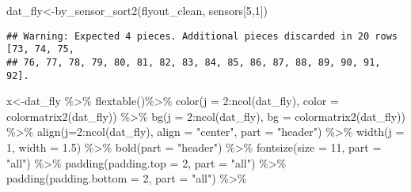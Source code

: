 \documentclass[
]{article}
\newenvironment{Shaded}{\begin{snugshade}}{\end{snugshade}}
\newcommand{\AttributeTok}[1]{\textcolor[rgb]{0.77,0.63,0.00}{#1}}
\newcommand{\DecValTok}[1]{\textcolor[rgb]{0.00,0.00,0.81}{#1}}
\newcommand{\FloatTok}[1]{\textcolor[rgb]{0.00,0.00,0.81}{#1}}
\newcommand{\FunctionTok}[1]{\textcolor[rgb]{0.00,0.00,0.00}{#1}}
\newcommand{\NormalTok}[1]{#1}
\newcommand{\OtherTok}[1]{\textcolor[rgb]{0.56,0.35,0.01}{#1}}
\newcommand{\SpecialCharTok}[1]{\textcolor[rgb]{0.00,0.00,0.00}{#1}}
\newcommand{\StringTok}[1]{\textcolor[rgb]{0.31,0.60,0.02}{#1}}
\begin{document}
\begin{longtable}[c]{|p{2.12in}|p{1.20in}|p{1.20in}|p{1.20in}|p{1.20in}|p{1.20in}|p{1.20in}|p{1.20in}|p{1.20in}|p{1.20in}|p{1.20in}|p{1.20in}}
\end{longtable}

\begin{Shaded}
\begin{Highlighting}[]
\NormalTok{dat\_fly}\OtherTok{\textless{}{-}}\FunctionTok{by\_sensor\_sort2}\NormalTok{(flyout\_clean, sensors[}\DecValTok{5}\NormalTok{,}\DecValTok{1}\NormalTok{])}
\end{Highlighting}
\end{Shaded}

\begin{verbatim}
## Warning: Expected 4 pieces. Additional pieces discarded in 20 rows [73, 74, 75,
## 76, 77, 78, 79, 80, 81, 82, 83, 84, 85, 86, 87, 88, 89, 90, 91, 92].
\end{verbatim}

\begin{Shaded}
\begin{Highlighting}[]
\NormalTok{x}\OtherTok{\textless{}{-}}\NormalTok{dat\_fly }\SpecialCharTok{\%\textgreater{}\%}
    \FunctionTok{flextable}\NormalTok{()}\SpecialCharTok{\%\textgreater{}\%}
    \FunctionTok{color}\NormalTok{(}\AttributeTok{j =} \DecValTok{2}\SpecialCharTok{:}\FunctionTok{ncol}\NormalTok{(dat\_fly), }\AttributeTok{color =} \FunctionTok{colormatrix2}\NormalTok{(dat\_fly)) }\SpecialCharTok{\%\textgreater{}\%}
    \FunctionTok{bg}\NormalTok{(}\AttributeTok{j =} \DecValTok{2}\SpecialCharTok{:}\FunctionTok{ncol}\NormalTok{(dat\_fly), }\AttributeTok{bg =} \FunctionTok{colormatrix2}\NormalTok{(dat\_fly)) }\SpecialCharTok{\%\textgreater{}\%}
    \FunctionTok{align}\NormalTok{(}\AttributeTok{j=}\DecValTok{2}\SpecialCharTok{:}\FunctionTok{ncol}\NormalTok{(dat\_fly), }\AttributeTok{align =} \StringTok{"center"}\NormalTok{, }\AttributeTok{part =} \StringTok{"header"}\NormalTok{) }\SpecialCharTok{\%\textgreater{}\%}
    \FunctionTok{width}\NormalTok{(}\AttributeTok{j =} \DecValTok{1}\NormalTok{, }\AttributeTok{width =} \FloatTok{1.5}\NormalTok{) }\SpecialCharTok{\%\textgreater{}\%}
    \FunctionTok{bold}\NormalTok{(}\AttributeTok{part =} \StringTok{"header"}\NormalTok{) }\SpecialCharTok{\%\textgreater{}\%}
    \FunctionTok{fontsize}\NormalTok{(}\AttributeTok{size =} \DecValTok{11}\NormalTok{, }\AttributeTok{part =} \StringTok{"all"}\NormalTok{) }\SpecialCharTok{\%\textgreater{}\%}
    \FunctionTok{padding}\NormalTok{(}\AttributeTok{padding.top =} \DecValTok{2}\NormalTok{, }\AttributeTok{part =} \StringTok{"all"}\NormalTok{) }\SpecialCharTok{\%\textgreater{}\%}
    \FunctionTok{padding}\NormalTok{(}\AttributeTok{padding.bottom =} \DecValTok{2}\NormalTok{, }\AttributeTok{part =} \StringTok{"all"}\NormalTok{) }\SpecialCharTok{\%\textgreater{}\%}

\end{Highlighting}
\end{Shaded}
\end{document}
